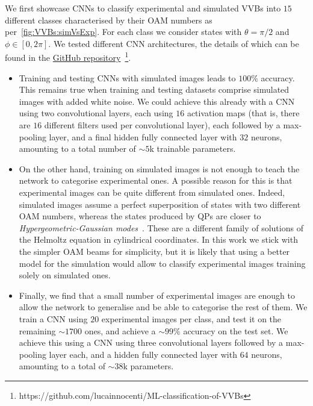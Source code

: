 We first showcase CNNs to classify experimental and simulated VVBs into $15$ different classes characterised by their OAM numbers as per~\cref{fig:VVBs:simVsExp}.
For each class we consider states with $\theta=\pi/2$ and $\phi\in[0,2\pi]$.
We tested different CNN architectures, the details of which can be found in the \href{https://github.com/lucainnocenti/ML-classification-of-VVBs}{GitHub repository}~\footnote{https://github.com/lucainnocenti/ML-classification-of-VVBs}.
\begin{itemize}
	\item Training and testing CNNs with simulated images leads to $100\%$ accuracy. This remains true when training and testing datasets comprise simulated images with added white noise.
	We could achieve this already with a CNN using two convolutional layers, each using $16$ activation maps (that is, there are $16$ different filters used per convolutional layer), each followed by a max-pooling layer, and a final hidden fully connected layer with $32$ neurons, amounting to a total number of $\sim5$k trainable parameters.
	\item On the other hand, training on simulated images is not enough to teach the network to categorise experimental ones. A possible reason for this is that experimental images can be quite different from simulated ones. Indeed, simulated images assume a perfect superposition of states with two different OAM numbers, whereas the states produced by \acp{QP} are closer to \emph{Hypergeometric-Gaussian modes}~\cite{karimi2007hypergeometricgaussian}. These are a different family of solutions of the Helmoltz equation in cylindrical coordinates.
	In this work we stick with the simpler OAM beams for simplicity, but it is likely that using a better model for the simulation would allow to classify experimental images training solely on simulated ones.
	\item Finally, we find that a small number of experimental images are enough to allow the network to generalise and be able to categorise the rest of them.
	We train a CNN using $20$ experimental images per class, and test it on the remaining $\sim1700$ ones, and achieve a $\sim 99\%$ accuracy on the test set.
	We achieve this using a CNN using three convolutional layers followed by a max-pooling layer each, and a hidden fully connected layer with $64$ neurons, amounting to a total of $\sim38$k parameters.
\end{itemize}


